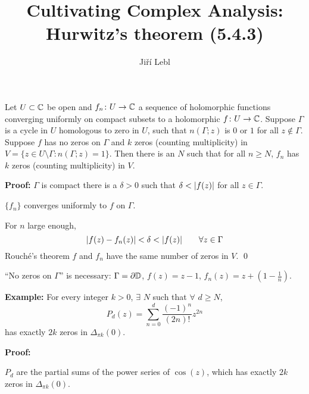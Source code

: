 \documentclass[10pt,aspectratio=169]{beamer}
\author{Ji\v{r}\'i Lebl}
\institute[OSU]{%
Departemento pri Matematiko de Oklahoma {\^S}tata Universitato}
\title{Cultivating Complex Analysis:\\%
Hurwitz's theorem (5.4.3)}
\date{}
\begin{document}
\begin{frame}
\titlepage
\end{frame}

\begin{frame}
\begin{theorem}[Hurwitz]
Let $U \subset {\mathbb{C}}$ be open and $f_n \colon U \to {\mathbb{C}}$ a sequence of
holomorphic functions converging uniformly on compact subsets
to a holomorphic $f \colon U \to {\mathbb{C}}$.  Suppose $\Gamma$ is
a cycle in $U$ homologous to zero in $U$,
such that $n(\Gamma;z)$ is $0$ or $1$ for all $z \notin \Gamma$.
Suppose $f$ has no zeros on $\Gamma$ and $k$ zeros (counting
multiplicity) in $V = \{ z \in U \setminus \Gamma : n(\Gamma;z) = 1 \}$.
Then there is an $N$ such that for all $n \geq N$,
$f_n$ has $k$ zeros (counting multiplicity) in $V$.
\end{theorem}

\medskip
\pause

\textbf{Proof:}
$\Gamma$ is compact \wthus
there is a $\delta > 0$ such that $\delta < \lvert {f(z)} \rvert$
for all $z \in \Gamma$.

\medskip
\pause

$\{ f_n \}$
converges uniformly to $f$ on $\Gamma$.

\medskip
\pause

For $n$ large enough,
\begin{equation*}
\lvert {f(z)-f_n(z)} \rvert < \delta < \lvert {f(z)} \rvert
\qquad \forall z \in \Gamma
\end{equation*}
\pause
Rouch\'e's theorem
\wthus
$f$ and $f_n$ have the same number of zeros in $V$.  \qed

\medskip
\pause

``No zeros on $\Gamma$'' is necessary:
\quad $\Gamma = \partial {\mathbb{D}}$,
\quad $f(z) = z-1$, \quad $f_n(z) = z+(1-\frac{1}{n})$.
\end{frame}

\begin{frame}
\textbf{Example:}
For every integer $k > 0$, $\exists$ $N$ such that
$\forall$ $d \geq N$,
\begin{equation*}
P_d(z) = \sum_{n=0}^d \frac{{(-1)}^n}{(2n)!}z^{2n}
\end{equation*}
has exactly $2k$ zeros in $\Delta_{\pi k}(0)$.

\medskip
\pause

\textbf{Proof:}

$P_d$ are the partial sums of the power series of
$\cos(z)$, which has exactly $2k$ zeros in $\Delta_{\pi k}(0)$.
\end{frame}
\end{document}
